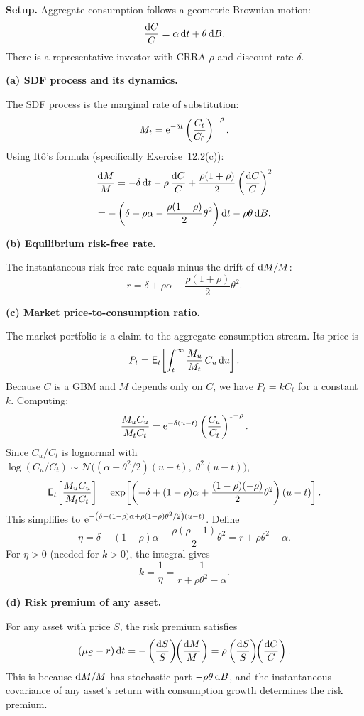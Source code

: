 
\textbf{Setup.}  Aggregate consumption follows a geometric Brownian motion:
$$\frac{\mathrm{d} C}{C} = \alpha\,\mathrm{d} t + \theta\,\mathrm{d} B.$$
There is a representative investor with CRRA $\rho$ and discount rate $\delta$.

\baselineskip
\textbf{(a) SDF process and its dynamics.}

The SDF process is the marginal rate of substitution:
$$M_t = \mathrm{e}^{-\delta t}\left(\frac{C_t}{C_0}\right)^{-\rho}.$$
Using It\^o's formula (specifically Exercise~12.2(c)):
$$\frac{\mathrm{d} M}{M} = -\delta\,\mathrm{d} t - \rho\,\frac{\mathrm{d} C}{C} + \frac{\rho(1+\rho)}{2}\left(\frac{\mathrm{d} C}{C}\right)^2$$
$$= -\left(\delta + \rho\alpha - \frac{\rho(1+\rho)}{2}\theta^2\right)\mathrm{d} t - \rho\theta\,\mathrm{d} B.$$

\baselineskip
\textbf{(b) Equilibrium risk-free rate.}

The instantaneous risk-free rate equals minus the drift of $\mathrm{d} M/M$:
$$r = \delta + \rho\alpha - \frac{\rho(1+\rho)}{2}\theta^2.$$

\baselineskip
\textbf{(c) Market price-to-consumption ratio.}

The market portfolio is a claim to the aggregate consumption stream.  Its price is
$$P_t = \mathsf{E}_t\!\left[\int_t^\infty \frac{M_u}{M_t}\,C_u\,\mathrm{d} u\right].$$
Because $C$ is a GBM and $M$ depends only on $C$, we have $P_t = kC_t$ for a constant $k$.  Computing:
$$\frac{M_u C_u}{M_t C_t} = \mathrm{e}^{-\delta(u-t)}\left(\frac{C_u}{C_t}\right)^{1-\rho}.$$
Since $C_u/C_t$ is lognormal with $\log(C_u/C_t) \sim \mathcal{N}\!\bigl((\alpha - \theta^2/2)(u-t),\;\theta^2(u-t)\bigr)$,
$$\mathsf{E}_t\!\left[\frac{M_u C_u}{M_t C_t}\right] = \exp\!\left[\left(-\delta + (1-\rho)\alpha + \frac{(1-\rho)(-\rho)}{2}\theta^2\right)(u-t)\right].$$
This simplifies to $\mathrm{e}^{-\left(\delta - (1-\rho)\alpha + \rho(1-\rho)\theta^2/2\right)(u-t)}$.  Define
$$\eta = \delta - (1-\rho)\alpha + \frac{\rho(\rho-1)}{2}\theta^2 = r + \rho\theta^2 - \alpha.$$
For $\eta > 0$ (needed for $k > 0$), the integral gives
$$k = \frac{1}{\eta} = \frac{1}{r + \rho\theta^2 - \alpha}.$$

\baselineskip
\textbf{(d) Risk premium of any asset.}

For any asset with price $S$, the risk premium satisfies
$$(\mu_S - r)\,\mathrm{d} t = -\left(\frac{\mathrm{d} S}{S}\right)\!\!\left(\frac{\mathrm{d} M}{M}\right) = \rho\left(\frac{\mathrm{d} S}{S}\right)\!\!\left(\frac{\mathrm{d} C}{C}\right).$$
This is because $\mathrm{d} M/M$ has stochastic part $-\rho\theta\,\mathrm{d} B$, and the instantaneous covariance of any asset's return with consumption growth determines the risk premium.

